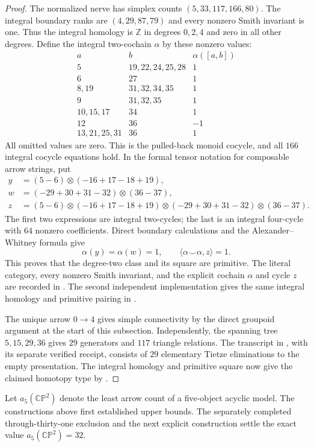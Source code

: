 \begin{proof}
The normalized nerve has simplex counts $(5,33,117,166,80)$.
The integral boundary ranks are $(4,29,87,79)$ and every nonzero
Smith invariant is one. Thus the integral homology is
$\mathbb Z$ in degrees $0,2,4$ and zero in all other degrees.
Define the integral two-cochain $\alpha$ by these nonzero values:
\[
\begin{array}{c|l|r}
a&b&\alpha([a,b])\\\hline
5&19,22,24,25,28&1\\
6&27&1\\
8,19&31,32,34,35&1\\
9&31,32,35&1\\
10,15,17&34&1\\
12&36&-1\\
13,21,25,31&36&1
\end{array}
\]
All omitted values are zero. This is the pulled-back monoid
cocycle, and all $166$ integral cocycle equations hold.
In the formal tensor notation for composable arrow strings, put
\[
\begin{aligned}
y&=(5-6)\otimes(-16+17-18+19),\\
w&=(-29+30+31-32)\otimes(36-37),\\
z&=(5-6)\otimes(-16+17-18+19)
   \otimes(-29+30+31-32)\otimes(36-37).
\end{aligned}
\]
The first two expressions are integral two-cycles; the last is an
integral four-cycle with $64$ nonzero coefficients. Direct boundary
calculations and the Alexander--Whitney formula give
\[
 \alpha(y)=\alpha(w)=1,
 \qquad \langle\alpha\smile\alpha,z\rangle=1.
\]
This proves that the degree-two class and its square are primitive.
The literal category, every nonzero Smith invariant, and the
explicit cochain $\alpha$ and cycle $z$ are recorded in
.
The second independent implementation gives the same integral
homology and primitive pairing in
.

The unique arrow $0\to4$ gives simple connectivity by the direct
groupoid argument at the start of this subsection. Independently,
the spanning tree $5,15,29,36$ gives $29$ generators and $117$
triangle relations. The transcript in
, with its separate verified
receipt, consists of $29$ elementary Tietze eliminations to the
empty presentation. The integral homology and primitive square
now give the claimed homotopy type by
\cite[Proposition~4C.3]{CP2-Hatcher2002}.
\end{proof}

\begin{remark*}
Let $a_5(\mathbb{CP}^2)$ denote the least arrow count of a
five-object acyclic model. The constructions above first established
upper bounds. The separately completed through-thirty-one exclusion
and the next explicit construction settle the exact value
$a_5(\mathbb{CP}^2)=32$.
\end{remark*}
